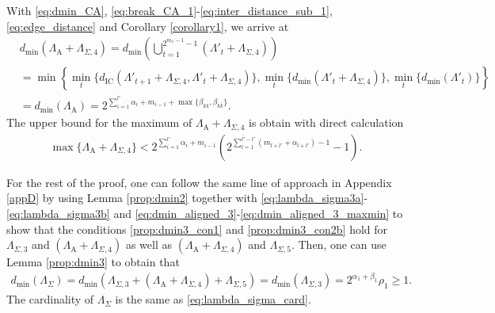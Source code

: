 \documentclass[12pt, draftclsnofoot, onecolumn]{IEEEtran}
\theoremstyle{definition}
\begin{document}
With \eqref{eq:dmin_CA}, \eqref{eq:break_CA_1}-\eqref{eq:inter_distance_sub_1}, \eqref{eq:edge_distance} and Corollary \ref{corollary1}, we arrive at
\begin{align}\label{eq:dmin_aligned_3}
&d_{\min}(\Lambda_\text{A}+\Lambda_{\Sigma,4})   = d_{\min}\left(\bigcup_{t=1}^{2^{m_{l'}-1}-1}\left(\Lambda'_t+\Lambda_{\Sigma,4}\right)\right) \nonumber \\
&= \min\left\{\min\limits_{t}\{d_{\text{IC}}(\Lambda'_{t+1}+\Lambda_{\Sigma,4},\Lambda'_{t}+\Lambda_{\Sigma,4})\}, \min\limits_{t}\{d_{\min}(\Lambda'_t+\Lambda_{\Sigma,4})\},\min\limits_{t}\{d_{\min}(\Lambda'_t)\}\right\} \nonumber \\
&= d_{\min}(\Lambda_\text{A})= 2^{\sum_{i=1}^{l'}\alpha_i+m_{i-1}+\max\{\beta_{kk},\beta_{k\bar{k}}\}}.
\end{align}
The upper bound for the maximum of $\Lambda_\text{A}+\Lambda_{\Sigma,4}$ is obtain with direct calculation
\begin{align}\label{eq:dmin_aligned_3_maxmin}
\max\{\Lambda_\text{A}+\Lambda_{\Sigma,4}\}<2^{\sum_{i=1}^{l'}\alpha_i+m_{i-1}}\left(2^{\sum_{l=1}^{\bar{l'}-l'}(m_{l+l'}+\alpha_{l+l'})-1}-1\right).
\end{align}

For the rest of the proof, one can follow the same line of approach in Appendix \ref{appD} by using Lemma \ref{prop:dmin2} together with \eqref{eq:lambda_sigma3a}-\eqref{eq:lambda_sigma3b} and \eqref{eq:dmin_aligned_3}-\eqref{eq:dmin_aligned_3_maxmin} to show that the conditions \eqref{prop:dmin3_con1} and \eqref{prop:dmin3_con2b} hold for $\Lambda_{\Sigma,3}$ and $(\Lambda_\text{A}+\Lambda_{\Sigma,4})$ as well as $(\Lambda_\text{A}+\Lambda_{\Sigma,4})$ and $\Lambda_{\Sigma,5}$. Then, one can use Lemma \ref{prop:dmin3} to obtain that
\begin{align}
d_{\min}(\Lambda_{\Sigma}) = d_{\min}(\Lambda_{\Sigma,3}+(\Lambda_\text{A}+\Lambda_{\Sigma,4})+\Lambda_{\Sigma,5}) =d_{\min}(\Lambda_{\Sigma,3}) = 2^{\alpha_1+\beta_1}\rho_1 \geq 1.
\end{align}
The cardinality of $\Lambda_{\Sigma}$ is the same as \eqref{eq:lambda_sigma_card}.
\end{document}
